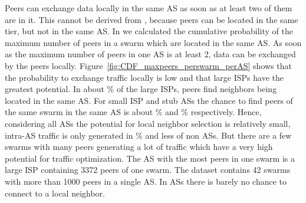 

Peers can exchange data locally in the same AS as soon as at least two of them are in it. This cannot be derived from , because peers can be located in the same tier, but not in the same AS.
In  we calculated the cumulative probability of the maximum number of peers in a swarm which are located in the same AS. As soon as the maximum number of peers in one AS is at least 2, data can be exchanged by the peers locally. Figure~\ref{fig:CDF_maxpeers_perswarm_perAS} shows that the probability to exchange traffic locally is low and that large ISPs have the greatest potential. In about \unit[15]{\%} of the large ISPs, peers find neighbors being located in the same AS. For small ISP and stub ASs the chance to find peers of the same swarm in the same AS is about \unit[10]{\%} and \unit[12]{\%} respectively. Hence, considering all ASs the potential for local neighbor selection is relatively small, intra-AS traffic is only generated in \unit[15]{\%} and less of non \tier ASs. But there are a few swarms with many peers generating a lot of traffic which have a very high potential for traffic optimization. The AS with the most peers in one swarm is a large ISP containing 3372 peers of one swarm. The dataset contains 42 swarms with more than 1000 peers in a single AS.
In \tier ASs there is barely no chance to connect to a local neighbor.

